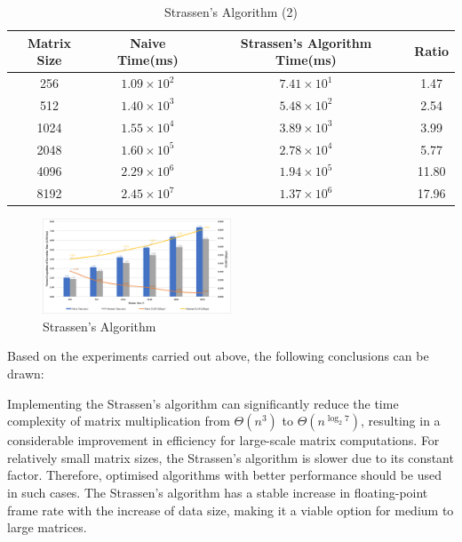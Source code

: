 \documentclass[conference]{IEEEtran}
\begin{document}
	\begin{table}[h]
		\centering
		\caption{Strassen's Algorithm (2)}
		\label{table:StrassenAlgorithm}
		\setlength\extrarowheight{2pt}
		\resizebox{0.5\textwidth}{!} {
		\begin{tabular}{|c|c|c|c|}
			\hline
			\textbf{Matrix Size} & \textbf{Naive Time(ms)} & \textbf{Strassen's Algorithm Time(ms)} & \textbf{Ratio} \\ \hline
			256 & $1.09 \times 10^2$ & $7.41\times 10^{1}$ & 1.47 \\ 
			512 & $1.40 \times 10^3$ & $5.48 \times 10^2$ & 2.54 \\ 
			1024 & $1.55 \times 10^{4}$ & $3.89 \times 10^3$ & 3.99 \\ 
			2048 & $1.60 \times 10^5$ & $2.78 \times 10^4$ & 5.77 \\ 
			4096 & $2.29 \times 10^6$ & $1.94 \times 10^5$ & 11.80 \\ 
			8192 & $2.45 \times 10^7$ & $1.37 \times 10^6$ & 17.96 \\ \hline
		\end{tabular}
	}
	\end{table}
	
	\begin{figure}[htbp]
		\centerline{\includegraphics[width=0.5\textwidth]{fig8.png}}
		\caption{Strassen's Algorithm}
		\label{fig::strassen}
	\end{figure}

	Based on the experiments carried out above, the following conclusions can be drawn:
	
	Implementing the Strassen's algorithm can significantly reduce the time complexity of matrix multiplication from $\Theta(n^3)$ to $\Theta(n^{\log_2 7})$, resulting in a considerable improvement in efficiency for large-scale matrix computations. For relatively small matrix sizes, the Strassen's algorithm is slower due to its constant factor. Therefore, optimised algorithms with better performance should be used in such cases. The Strassen's algorithm has a stable increase in floating-point frame rate with the increase of data size, making it a viable option for medium to large matrices.
	
\end{document}
